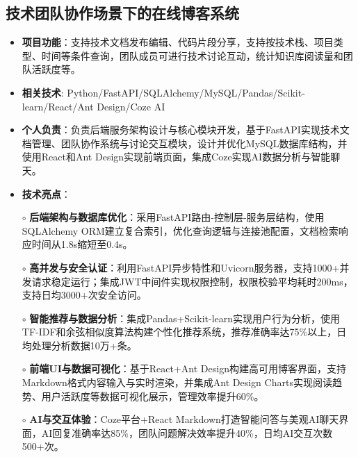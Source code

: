 \subsection{\textbf{技术团队协作场景下的在线博客系统} \hspace{2cm}{2025.06 -- 2025.07}}
  \begin{normalsize}
    \begin{itemize}
    \item \textbf{项目功能}：支持技术文档发布编辑、代码片段分享，支持按技术栈、项目类型、时间等条件查询，团队成员可进行技术讨论互动，统计知识库阅读量和团队活跃度等。
    \item \textbf{相关技术}: Python/FastAPI/SQLAlchemy/MySQL/Pandas/Scikit-learn/React/Ant Design/Coze AI
    \item \textbf{个人负责}：负责后端服务架构设计与核心模块开发，基于FastAPI实现技术文档管理、团队协作系统与讨论交互模块，设计并优化MySQL数据库结构，并使用React和Ant Design实现前端页面，集成Coze实现AI数据分析与智能聊天。
    \item \textbf{技术亮点}：
    \setlength{\itemindent}{1em} %
      \item[$\circ$] \textbf{后端架构与数据库优化}：采用FastAPI路由-控制层-服务层结构，使用SQLAlchemy ORM建立复合索引，优化查询逻辑与连接池配置，文档检索响应时间从1.8s缩短至0.4s。
      \item[$\circ$] \textbf{高并发与安全认证}：利用FastAPI异步特性和Uvicorn服务器，支持1000+并发请求稳定运行；集成JWT中间件实现权限控制，权限校验平均耗时200ms，支持日均3000+次安全访问。
      \item[$\circ$] \textbf{智能推荐与数据分析}：集成Pandas+Scikit-learn实现用户行为分析，使用TF-IDF和余弦相似度算法构建个性化推荐系统，推荐准确率达75\%以上，日均处理分析数据10万+条。
      \item[$\circ$] \textbf{前端UI与数据可视化}：基于React+Ant Design构建高可用博客界面，支持Markdown格式内容输入与实时渲染，并集成Ant Design Charts实现阅读趋势、用户活跃度等数据可视化展示，管理效率提升60\%。
      \item[$\circ$] \textbf{AI与交互体验}：Coze平台+React Markdown打造智能问答与美观AI聊天界面，AI回复准确率达85\%，团队问题解决效率提升40\%，日均AI交互次数500+次。
    \end{itemize}
  \end{normalsize}